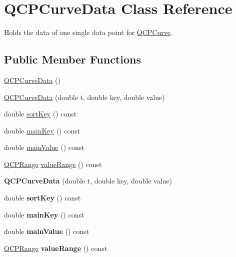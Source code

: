 \hypertarget{class_q_c_p_curve_data}{}\section{Q\+C\+P\+Curve\+Data Class Reference}
\label{class_q_c_p_curve_data}


Holds the data of one single data point for \hyperlink{class_q_c_p_curve}{Q\+C\+P\+Curve}.  


\subsection*{Public Member Functions}
\begin{DoxyCompactItemize}
\item 
\hyperlink{class_q_c_p_curve_data_a48252779b5198a509d99c69ae223fbf8}{Q\+C\+P\+Curve\+Data} ()
\item 
\hyperlink{class_q_c_p_curve_data_a3586be0cc6f8db15bcdd0c0d03b0c173}{Q\+C\+P\+Curve\+Data} (double t, double key, double value)
\item 
double \hyperlink{class_q_c_p_curve_data_a5a464c57c73904310db53fa3c6ff8361}{sort\+Key} () const 
\item 
double \hyperlink{class_q_c_p_curve_data_a77c24dcafb39e50396f0b1be34c78edc}{main\+Key} () const 
\item 
double \hyperlink{class_q_c_p_curve_data_ab2e58a5711ff91a48c9a722fa42fe60b}{main\+Value} () const 
\item 
\hyperlink{class_q_c_p_range}{Q\+C\+P\+Range} \hyperlink{class_q_c_p_curve_data_a50b97325b0edd13f6cff590ede62eb3c}{value\+Range} () const 
\item 
{\bfseries Q\+C\+P\+Curve\+Data} (double t, double key, double value)\hypertarget{class_q_c_p_curve_data_a3586be0cc6f8db15bcdd0c0d03b0c173}{}\label{class_q_c_p_curve_data_a3586be0cc6f8db15bcdd0c0d03b0c173}

\item 
double {\bfseries sort\+Key} () const \hypertarget{class_q_c_p_curve_data_a5a464c57c73904310db53fa3c6ff8361}{}\label{class_q_c_p_curve_data_a5a464c57c73904310db53fa3c6ff8361}

\item 
double {\bfseries main\+Key} () const \hypertarget{class_q_c_p_curve_data_a77c24dcafb39e50396f0b1be34c78edc}{}\label{class_q_c_p_curve_data_a77c24dcafb39e50396f0b1be34c78edc}

\item 
double {\bfseries main\+Value} () const \hypertarget{class_q_c_p_curve_data_ab2e58a5711ff91a48c9a722fa42fe60b}{}\label{class_q_c_p_curve_data_ab2e58a5711ff91a48c9a722fa42fe60b}

\item 
\hyperlink{class_q_c_p_range}{Q\+C\+P\+Range} {\bfseries value\+Range} () const \hypertarget{class_q_c_p_curve_data_a50b97325b0edd13f6cff590ede62eb3c}{}\label{class_q_c_p_curve_data_a50b97325b0edd13f6cff590ede62eb3c}

\end{DoxyCompactItemize}
